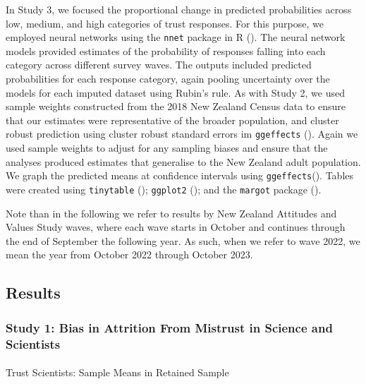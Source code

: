 \documentclass[
  single column]{article}
\makeatletter
\let\oldparagraph\paragraph
\renewcommand{\paragraph}{
    \@ifstar
      \xxxParagraphStar
      \xxxParagraphNoStar
  }
\newcommand{\xxxParagraphStar}[1]{\oldparagraph*{#1}\mbox{}}
\newcommand{\xxxParagraphNoStar}[1]{\oldparagraph{#1}\mbox{}}
\makeatother
\begin{document}
In Study 3, we focused the proportional change in predicted
probabilities across low, medium, and high categories of trust
responses. For this purpose, we employed neural networks using the
\texttt{nnet} package in R (). The neural network models provided estimates of the probability
of responses falling into each category across different survey waves.
The outputs included predicted probabilities for each response category,
again pooling uncertainty over the models for each imputed dataset using
Rubin's rule. As with Study 2, we used sample weights constructed from
the 2018 New Zealand Census data to ensure that our estimates were
representative of the broader population, and cluster robust prediction
using cluster robust standard errors im \texttt{ggeffects}
(). Again we used sample
weights to adjust for any sampling biases and ensure that the analyses
produced estimates that generalise to the New Zealand adult population.
We graph the predicted means at confidence intervals using
\texttt{ggeffects}(). Tables
were created using \texttt{tinytable}
(); \texttt{ggplot2}
(); and the \texttt{margot}
package ().

Note than in the following we refer to results by New Zealand Attitudes
and Values Study waves, where each wave starts in October and continues
through the end of September the following year. As such, when we refer
to wave 2022, we mean the year from October 2022 through October 2023.

\subsection{Results}\label{results}

\subsubsection{Study 1: Bias in Attrition From Mistrust in Science and
Scientists}\label{study-1-bias-in-attrition-from-mistrust-in-science-and-scientists}

\paragraph{Trust Scientists: Sample Means in Retained
Sample}\label{trust-scientists-sample-means-in-retained-sample}
\end{document}
